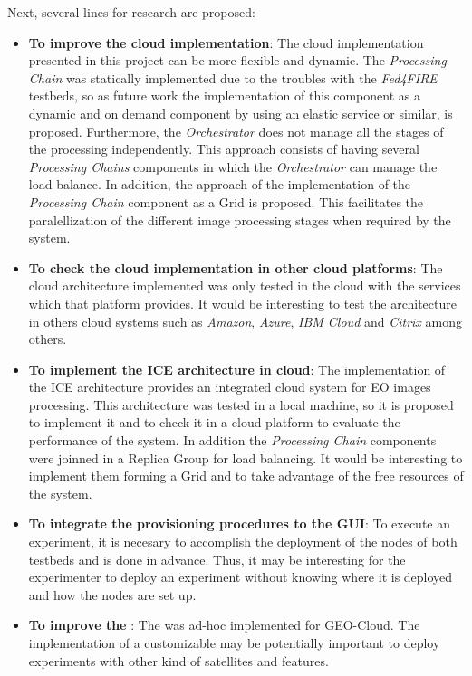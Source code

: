 Next, several lines for research are proposed:
\begin{itemize}
\item \textbf{To improve the cloud implementation}: The cloud implementation
  presented in this project can be more flexible and dynamic. The
  \emph{Processing Chain} was statically implemented due to the troubles with
  the \emph{Fed4FIRE} testbeds, so as future work the implementation of this
  component as a dynamic and on demand component by using an elastic service or
  similar, is proposed. Furthermore, the
  \emph{Orchestrator} does not manage all the stages of the processing
  independently. This approach consists of having several \emph{Processing
    Chains} components in which the \emph{Orchestrator} can manage the load balance. In
  addition, the approach of the implementation of the \emph{Processing Chain}
  component as a Grid is proposed. This facilitates the  paralellization of the different image processing stages when required by the system.

\item \textbf{To check the cloud implementation in other cloud platforms}: The
  cloud architecture implemented was only tested in the \bonfire cloud with the
  services which that platform provides. It would be interesting to test the architecture
  in others cloud systems such as \emph{Amazon}, \emph{Azure}, \emph{IBM Cloud}
  and \emph{Citrix} among others. 

\item \textbf{To implement the ICE architecture in cloud}: The implementation of
  the ICE architecture provides an integrated cloud system for \ac{EO} images
  processing. This architecture was tested in a local machine, so it is proposed
  to implement it and to check it in a cloud platform to evaluate the
  performance of the system. In addition the \emph{Processing Chain} components
  were joinned in a Replica Group for load balancing. It would be interesting to
  implement them forming a Grid and to take advantage of the free resources of
  the system.

\item \textbf{To integrate the provisioning procedures to the \ac{GUI}}: To
  execute an experiment, it is necesary to accomplish the deployment of the nodes of both
  testbeds \bonfire and \vw is done in advance. Thus, it may be interesting for
  the experimenter  to deploy an experiment without knowing where it is
  deployed and how the nodes are set up.

\item \textbf{To improve the \sss}: The \sss was ad-hoc implemented for
  GEO-Cloud. The implementation of a customizable \sss may be potentially
  important to deploy experiments with other kind of satellites and features.


\end{itemize}
